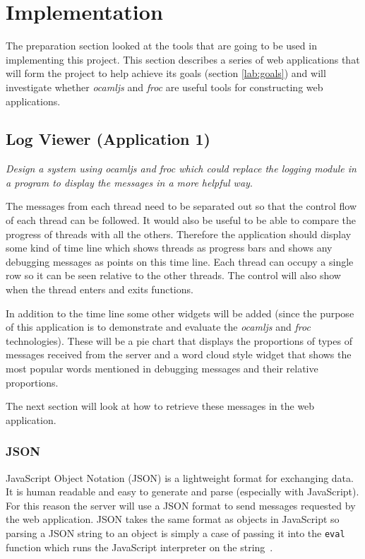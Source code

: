 \chapter{Implementation}
The preparation section looked at the tools that are going to be used in implementing this project. This section describes a series of web applications that will form the project to help achieve its goals (section \ref{lab:goals}) and will investigate whether \emph{ocamljs} and \emph{froc} are useful tools for constructing web applications.

\section{Log Viewer (Application 1)}
\emph{Design a system using \emph{ocamljs} and \emph{froc} which could replace the logging module in a program to display the messages in a more helpful way}.

The messages from each thread need to be separated out so that the control flow of each thread can be followed. It would also be useful to be able to compare the progress of threads with all the others. Therefore the application should display some kind of time line which shows threads as progress bars and shows any debugging messages as points on this time line. Each thread can occupy a single row so it can be seen relative to the other threads. The control will also show when the thread enters and exits functions.

In addition to the time line some other widgets will be added (since the purpose of this application is to demonstrate and evaluate the \emph{ocamljs} and \emph{froc} technologies). These will be a pie chart that displays the proportions of types of messages received from the server and a word cloud style widget that shows the most popular words mentioned in debugging messages and their relative proportions.

The next section will look at how to retrieve these messages in the web application.

\subsection{JSON}
JavaScript Object Notation (JSON) is a lightweight format for exchanging data. It is human readable and easy to generate and parse (especially with JavaScript). For this reason the server will use a JSON format to send messages requested by the web application. JSON takes the same format as objects in JavaScript so parsing a JSON string to an object is simply a case of passing it into the \texttt{eval} function which runs the JavaScript interpreter on the string~\cite{bib:json}.

